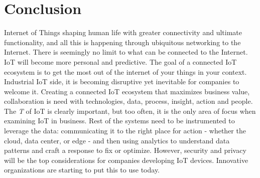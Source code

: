 \documentclass[sigconf]{acmart}
\begin{document}
\section{Conclusion}

Internet of Things shaping human life with greater connectivity and ultimate functionality, and all this is happening through ubiquitous networking to the Internet. There is seemingly no limit to what can be connected to the Internet. IoT will become more personal and predictive. The goal of a connected IoT ecosystem is to get the most out of the internet of your things in your context. Industrial IoT side, it is becoming disruptive yet inevitable for companies to welcome it. Creating a connected IoT ecosystem that maximizes business value, collaboration is need with technologies, data, process, insight, action and people. The {\em T} of IoT is clearly important, but too often, it is the only area of focus when examining IoT in business. Rest of the systems need to be instrumented to leverage the data: communicating it to the right place for action - whether the cloud, data center, or edge - and then using analytics to understand data patterns and craft a response to fix or optimize. However, security and privacy will be the top considerations for companies developing IoT devices. Innovative organizations are starting to put this to use today.



 


\end{document}
